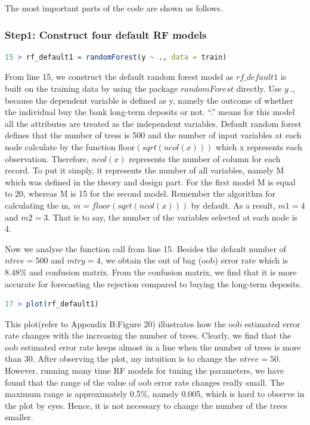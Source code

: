 \documentclass[12pt, a4paper, bibliography=totoc, english]{scrartcl}
\begin{document}
The most important parts of the code are shown as follows.



\subsubsection{Step1: Construct four default RF models}

\begin{lstlisting}[language = R]
15 > rf_default1 = randomForest(y ~ ., data = train)
\end{lstlisting}
From line 15, we construct the default random forest model as $rf\_default1$ is built on the training data by using the package $randomForest$ directly. Use $y~.$, because the dependent variable is defined as y, namely the outcome of whether the individual buy the bank long-term deposits or not. ``.'' means for this model all the attributes are treated as the independent variables. Default random forest defines that the number of tress is 500 and the number of input variables at each node calculate by the function floor$(sqrt(ncol(x)))$ which x represents each observation. Therefore, $ncol(x)$ represents the number of column for each record. To put it simply, it represents the number of all variables, namely M which was defined in the theory and design part. For the first model M is equal to 20, whereas M is 15 for the second model. Remember the algorithm for calculating the m, $m= floor(sqrt(ncol(x)))$ by default. As a result, $m1=4$ and $m2=3$. That is to say, the number of the variables selected at each node is 4. 


Now we analyse the function call from line 15. Besides the default number of $ntree=500$ and $mtry=4$, we obtain the out of bag (oob) error rate which is 8.48\% and confusion matrix. From the confusion matrix, we find that it is more accurate for forecasting the rejection compared to buying the long-term deposits. \\
\begin{lstlisting}[language = R]
17 > plot(rf_default1)  
\end{lstlisting}
This plot(refer to Appendix B:Figure 20) illustrates how the oob estimated error rate changes with the increasing the number of trees. Clearly, we find that the oob estimated error rate keeps almost in a line when the number of trees is more than 30. After observing the plot, my intuition is to change the $ntree=50$. However, running many time RF models for tuning the parameters, we have found that the range of the value of oob error rate changes really small. The maximum range is approximately 0.5\%, namely 0.005, which is hard to observe in the plot by eyes. Hence, it is not necessary to change the number of the trees smaller.
\end{document}

